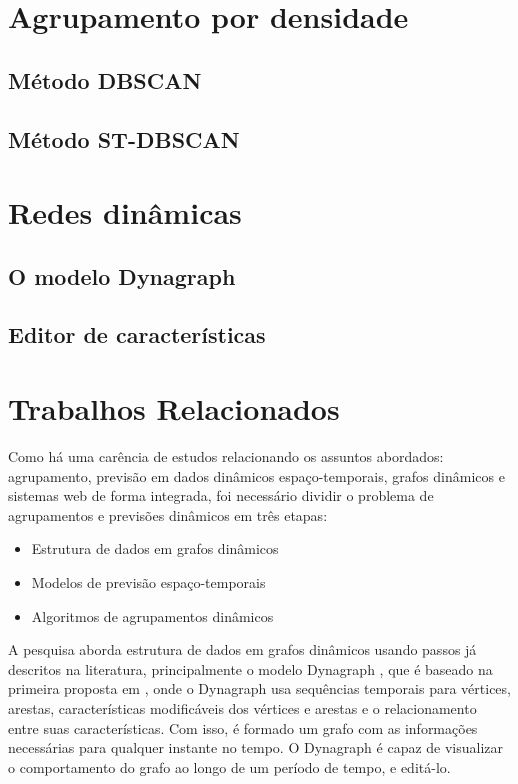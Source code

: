 \section{Agrupamento por densidade}
\subsection{Método DBSCAN}
\subsection{Método ST-DBSCAN}
\section{Redes dinâmicas}
\subsection{O modelo Dynagraph}
\subsection{Editor de características}
\section{Trabalhos Relacionados}

Como há uma carência de estudos relacionando os assuntos abordados: agrupamento,
previsão em dados dinâmicos espaço-temporais, grafos dinâmicos e sistemas web
de forma integrada, foi necessário dividir o problema de agrupamentos e previsões dinâmicos em três etapas:
\begin{itemize}
\item Estrutura de dados em grafos dinâmicos
\item Modelos de previsão espaço-temporais
\item Algoritmos de agrupamentos dinâmicos
\end{itemize}

A pesquisa aborda estrutura de dados em grafos dinâmicos usando passos já descritos na literatura,
principalmente o modelo Dynagraph \cite{dynagraph}, que é baseado na primeira proposta
em \cite{dynagraph2012}, onde o Dynagraph usa sequências temporais para vértices, arestas,
características modificáveis dos vértices e arestas e o relacionamento entre suas características.
Com isso, é formado um grafo com as informações necessárias para qualquer instante no tempo.
O Dynagraph é capaz de visualizar o comportamento do grafo ao longo de um período de tempo,
e editá-lo.

